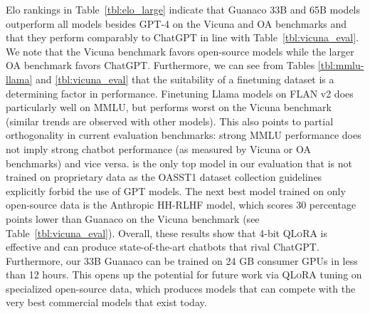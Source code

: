 Elo rankings in Table~\ref{tbl:elo_large} indicate that {Guanaco} 33B and 65B models outperform all models besides GPT-4 on the Vicuna and OA benchmarks and that they perform comparably to ChatGPT in line with Table~\ref{tbl:vicuna_eval}. We note that the Vicuna benchmark favors open-source models while the larger OA benchmark favors ChatGPT. Furthermore, we can see from Tables \ref{tbl:mmlu-llama} and \ref{tbl:vicuna_eval} that the suitability of a finetuning dataset is a determining factor in performance. Finetuning Llama models on FLAN v2 does particularly well on MMLU, but performs worst on the Vicuna benchmark (similar trends are observed with other models). This also points to partial orthogonality in current evaluation benchmarks: strong MMLU performance does not imply strong chatbot performance (as measured by Vicuna or OA benchmarks) and vice versa. is the only top model in our evaluation that is not trained on proprietary data as the OASST1 dataset collection guidelines explicitly forbid the use of GPT models. The next best model trained on only open-source data is the Anthropic HH-RLHF model, which scores 30 percentage points lower than {Guanaco} on the Vicuna benchmark (see Table~\ref{tbl:vicuna_eval}). Overall, these results show that 4-bit \textsc{QLoRA} is effective and can produce state-of-the-art chatbots that rival ChatGPT. Furthermore, our 33B {Guanaco} can be trained on 24 GB consumer GPUs in less than 12 hours. This opens up the potential for future work via \textsc{QLoRA} tuning on specialized open-source data, which produces models that can compete with the very best commercial models that exist today.

